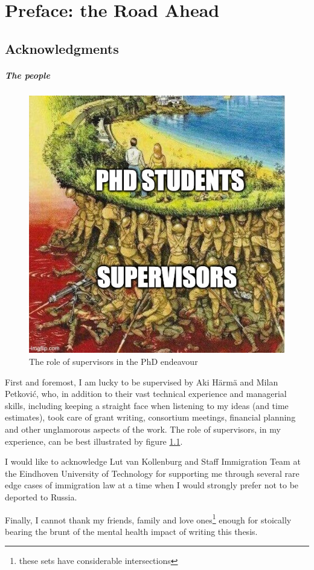 \chapter{Preface: the Road Ahead}
\label{ch:preface}

\section{Acknowledgments}

\paragraph{The people}

\begin{figure}
    \centering
    \includegraphics[width=0.55\linewidth]{images/soldiers_meme.jpg}
    \caption{The role of supervisors in the PhD endeavour}
    \label{fig:soldiers-meme}
\end{figure}

First and foremost, I am lucky to be supervised by Aki H{\"a}rm{\"a} and Milan Petkovi{\'c}, who, in addition to their vast technical experience and managerial skills, including keeping a straight face when listening to my ideas (and time estimates), took care of grant writing, consortium meetings, financial planning and other unglamorous aspects of the work.
The role of supervisors, in my experience, can be best illustrated by figure \ref{fig:soldiers-meme}.

I would like to acknowledge Lut van Kollenburg and Staff Immigration Team at the Eindhoven University of Technology for supporting me through several rare edge cases of immigration law at a time when I would strongly prefer not to be deported to Russia. 

Finally, I cannot thank my friends, family and love ones\footnote{these sets have considerable intersections} enough for stoically bearing the brunt of the mental health impact of writing this thesis.

